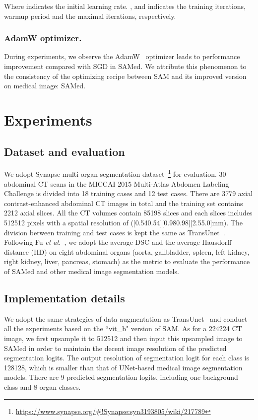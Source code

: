 \documentclass[runningheads]{llncs}
\newcommand{\etal}{\textit{et al.}}
\begin{document}
Where  indicates the initial learning rate. ,  and  indicates the training iterations, warmup period and the maximal iterations, respectively.

\subsubsection{AdamW optimizer.} During experiments, we observe the AdamW~\cite{loshchilovdecoupled} optimizer leads to performance improvement compared with SGD in SAMed. We attribute this phenomenon to the consistency of the optimizing recipe between SAM and its improved version on medical image: SAMed.

\section{Experiments}

\subsection{Dataset and evaluation}
We adopt Synapse multi-organ segmentation dataset~\footnote{\url{https://www.synapse.org/\#!Synapse:syn3193805/wiki/217789}} for evaluation. 30 abdominal CT scans in the MICCAI 2015 Multi-Atlas Abdomen Labeling Challenge is divided into 18 training cases and 12 test cases. There are 3779 axial contrast-enhanced abdominal CT images in total and the training set contains 2212 axial slices. All the CT volumes contain 85198 slices and each slices includes 512512 pixels with a spatial resolution of ([0.540.54][0.980.98][2.55.0]mm). The division between training and test cases is kept the same as TransUnet~\cite{chen2021transunet}. Following Fu \etal~\cite{fu2020domain}, we adopt the average DSC and the average Hausdorff distance (HD) on eight abdominal organs (aorta, gallbladder, spleen, left kidney, right kidney, liver, pancreas, stomach) as the metric to evaluate the performance of SAMed and other medical image segmentation models.

\subsection{Implementation details}
We adopt the same strategies of data augmentation as TransUnet~\cite{chen2021transunet} and conduct all the experiments based on the ``vit\_b" version of SAM. As for a 224224 CT image, we first upsample it to 512512 and then input this upsampled image to SAMed in order to maintain the decent image resolution of the predicted segmentation logits. The output resolution of segmentation logit for each class is 128128, which is smaller than that of UNet-based medical image segmentation models. There are 9 predicted segmentation logits, including one background class and 8 organ classes.
\end{document}
